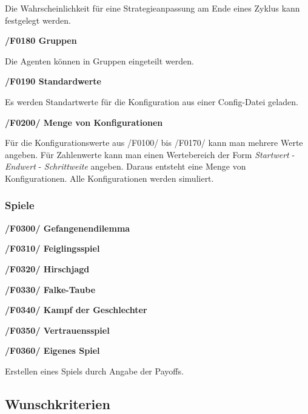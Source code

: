 Die Wahrscheinlichkeit für eine Strategieanpassung am Ende eines Zyklus kann festgelegt werden.

\textbf{/F0180 Gruppen}

Die Agenten können in Gruppen eingeteilt werden.

\textbf{/F0190 Standardwerte}

Es werden Standartwerte für die Konfiguration aus einer Config-Datei geladen.

\textbf{/F0200/ Menge von Konfigurationen}

Für die Konfigurationswerte aus /F0100/ bis /F0170/ kann man mehrere Werte angeben. Für Zahlenwerte kann man einen Wertebereich der Form \emph{Startwert} - \emph{Endwert} - \emph{Schrittweite} angeben. Daraus entsteht eine Menge von Konfigurationen. Alle Konfigurationen werden simuliert.

\subsubsection{Spiele}

\textbf{/F0300/ Gefangenendilemma}

\textbf{/F0310/ Feiglingsspiel}

\textbf{/F0320/ Hirschjagd}

\textbf{/F0330/ Falke-Taube}

\textbf{/F0340/ Kampf der Geschlechter}

\textbf{/F0350/ Vertrauensspiel}

\textbf{/F0360/ Eigenes Spiel}

Erstellen eines Spiels durch Angabe der Payoffs. 

\subsection{Wunschkriterien}
